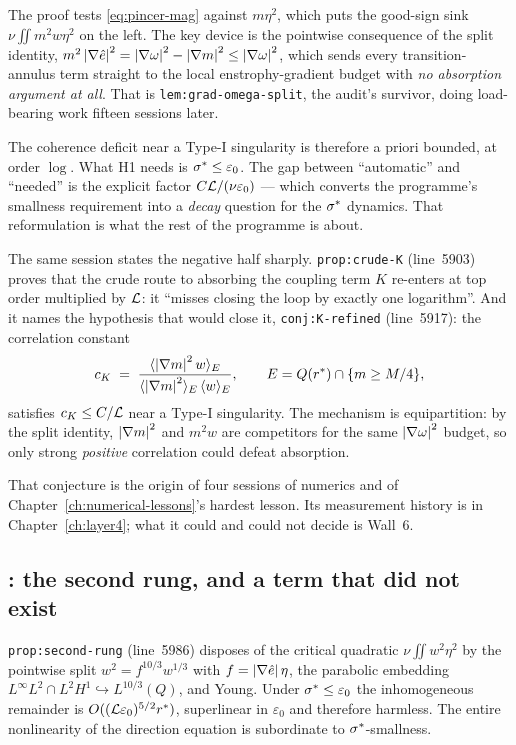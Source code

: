 The proof tests \eqref{eq:pincer-mag} against \(m\eta^2\), which puts the
good-sign sink \(\nu\iint m^2w\eta^2\) on the left. The key device is the
pointwise consequence of the split identity,
\(m^2\left|\nabla\hat{e}\right|^2=\left|\nabla\omega\right|^2-\left|\nabla m\right|^2\le\left|\nabla\omega\right|^2\),
which sends every transition-annulus term straight to the local
enstrophy-gradient budget with \emph{no absorption argument at all}. That is
\texttt{lem:grad-omega-split}, the audit's survivor, doing load-bearing work
fifteen sessions later.

The coherence deficit near a Type-I singularity is therefore a priori bounded,
at order \(\log\). What H1 needs is \(\sigma^{*}\le\varepsilon_0\). The gap between
``automatic'' and ``needed'' is the explicit factor \(C\mathcal{L}/(\nu\varepsilon_0)\)
--- which converts the programme's smallness requirement into a \emph{decay}
question for the \(\sigma^{*}\) dynamics. That reformulation is what the rest of
the programme is about.

The same session states the negative half sharply.
\texttt{prop:crude-K} (line~5903) proves that the crude route to absorbing the
coupling term \(K\) re-enters at top order multiplied by \(\mathcal{L}\): it ``misses
closing the loop by exactly one logarithm''. And it names the hypothesis that
would close it, \texttt{conj:K-refined} (line~5917): the correlation constant
\[
  c_K \;=\; \frac{\langle\left|\nabla m\right|^2 w\rangle_E}
                 {\langle\left|\nabla m\right|^2\rangle_E\,\langle w\rangle_E},
  \qquad E=Q(r^{*})\cap\{m\ge M/4\},
\]
satisfies \(c_K\le C/\mathcal{L}\) near a Type-I singularity. The mechanism is
equipartition: by the split identity, \(\left|\nabla m\right|^2\) and \(m^2w\) are
competitors for the same \(\left|\nabla\omega\right|^2\) budget, so only strong
\emph{positive} correlation could defeat absorption.

That conjecture is the origin of four sessions of numerics and of
Chapter~\ref{ch:numerical-lessons}'s hardest lesson. Its measurement history
is in Chapter~\ref{ch:layer4}; what it could and could not decide is Wall~6.

\subsection{\texorpdfstring{: the second rung, and a term that did not exist}{S35: the second rung, and a term that did not exist}}

\texttt{prop:second-rung} (line~5986) disposes of the critical quadratic
\(\nu\iint w^2\eta^2\) by the pointwise split \(w^2=f^{10/3}w^{1/3}\) with
\(f=\left|\nabla\hat{e}\right|\eta\), the parabolic embedding
\(L^\infty L^2\cap L^2H^1\hookrightarrow L^{10/3}(Q)\), and Young. Under
\(\sigma^{*}\le\varepsilon_0\) the inhomogeneous remainder is
\(O((\mathcal{L}\varepsilon_0)^{5/2}r^{*})\), superlinear in \(\varepsilon_0\) and
therefore harmless. The entire nonlinearity of the direction equation is
subordinate to \(\sigma^{*}\)-smallness.

